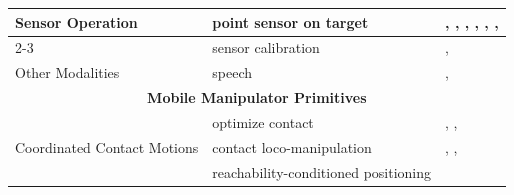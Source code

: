 \begin{table}[!h]
\begin{tabular}{|p{4cm}|p{5cm}|p{15cm}|}
\hline
\multirow{2}{*}{\parbox{3cm}{Sensor Operation}}
    & point sensor on target & \cite{Weser2009AutonomousPF}, \cite{Bruemmer2010BehaviorBC}, \cite{Youngquist2022EvaluatingSA}, \cite{Tsay2010MaterialHO}, \cite{Hornung2012NavigationIT}, \cite{Lim2019SkillbasedAA}, \cite{Finean2021WhereSI} \\
\cline{2-3}
    & sensor calibration     & \cite{Bruemmer2010BehaviorBC}, \cite{Partovi2017ReactiveIM} \\
\hline
Other Modalities & speech    & \cite{Stckler2013IncreasingFO}, \cite{Choi2009HandIO} \\
\hline
\multicolumn{3}{|c|}{\textbf{Mobile Manipulator Primitives}} \\
\hline
\multirow{3}{*}{\parbox{3cm}{Coordinated Contact Motions}}
    & optimize contact                     & \cite{Rigo2022ContactOF}, \cite{Bertoncelli2020LinearTM}, \cite{Meng2023AerialMS} \\
\cline{2-3}
    & contact loco-manipulation            & \cite{Rigo2022ContactOF}, \cite{Arm2024PedipulateEM}, \cite{Dadiotis2025DynamicOG} \\
\cline{2-3}
    & reachability-conditioned positioning & \cite{Jauhri2022RobotLO} \\
\hline
\end{tabular}
\end{table}


